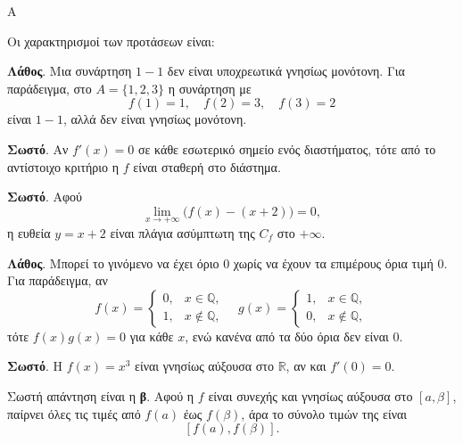 \begin{thema}{Α}
\begin{erwthma}
\item {}

\item {}

\item {}

\item Οι χαρακτηρισμοί των προτάσεων είναι:
\begin{alist}
\item \textbf{Λάθος}. Μια συνάρτηση $1-1$ δεν είναι υποχρεωτικά γνησίως μονότονη. Για παράδειγμα, στο $A=\{1,2,3\}$ η συνάρτηση με
\[ f(1)=1,\quad f(2)=3,\quad f(3)=2 \]
είναι $1-1$, αλλά δεν είναι γνησίως μονότονη.
\item \textbf{Σωστό}. Αν $f'(x)=0$ σε κάθε εσωτερικό σημείο ενός διαστήματος, τότε από το αντίστοιχο κριτήριο η $f$ είναι σταθερή στο διάστημα.
\item \textbf{Σωστό}. Αφού
\[ \lim_{x\to+\infty}\bigl(f(x)-(x+2)\bigr)=0, \]
η ευθεία $y=x+2$ είναι πλάγια ασύμπτωτη της $C_f$ στο $+\infty$.
\item \textbf{Λάθος}. Μπορεί το γινόμενο να έχει όριο $0$ χωρίς να έχουν τα επιμέρους όρια τιμή $0$. Για παράδειγμα, αν
\[
f(x)=
\begin{cases}
0, & x\in\mathbb{Q},\\
1, & x\notin\mathbb{Q},
\end{cases}
\quad
g(x)=
\begin{cases}
1, & x\in\mathbb{Q},\\
0, & x\notin\mathbb{Q},
\end{cases}
\]
τότε $f(x)g(x)=0$ για κάθε $x$, ενώ κανένα από τα δύο όρια δεν είναι $0$.
\item \textbf{Σωστό}. Η $f(x)=x^3$ είναι γνησίως αύξουσα στο $\mathbb{R}$, αν και $f'(0)=0$.
\end{alist}

\item Σωστή απάντηση είναι η \textbf{β}. Αφού η $f$ είναι συνεχής και γνησίως αύξουσα στο $[a,\beta]$, παίρνει όλες τις τιμές από $f(a)$ έως $f(\beta)$, άρα το σύνολο τιμών της είναι
\[ [f(a),f(\beta)]. \]
\end{erwthma}
\end{thema}

